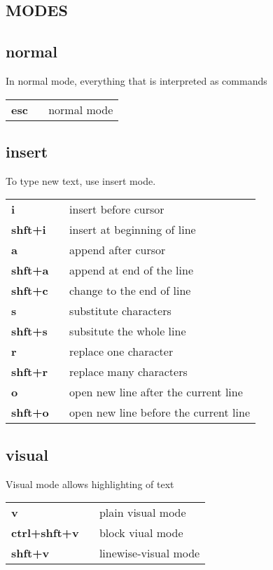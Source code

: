 \documentclass[10pt,landscape]{article}
\begin{document}
\begin{multicols*}{3}

\section{MODES}
\subsection{normal}
In normal mode, everything that is interpreted as commands \\
\vspace{5pt}
\begin{tabular}{@{\hspace{2mm}}ll@{}}
{\bfseries esc} &~ normal mode \\
\end{tabular}

\subsection{insert}
To type new text, use insert mode. \\
\vspace{5pt}
\begin{tabular}{@{\hspace{2mm}}ll@{}}
{\bfseries i} &~ insert before cursor \\
{\bfseries shft+i} &~ insert at beginning of line \\
{\bfseries a} &~ append after cursor \\
{\bfseries shft+a} &~ append at end of the line \\
{\bfseries shft+c} &~ change to the end of line \\
{\bfseries s} &~ substitute characters \\
{\bfseries shft+s} &~ subsitute the whole line \\
{\bfseries r} &~ replace one character \\
{\bfseries shft+r} &~ replace many characters \\
{\bfseries o} &~ open new line after the current line \\
{\bfseries shft+o} &~ open new line before the current line \\
\end{tabular}

\subsection{visual}
Visual mode allows highlighting of text \\
\vspace{5pt}
\begin{tabular}{@{\hspace{2mm}}ll@{}}
{\bfseries v} &~ plain visual mode \\
{\bfseries ctrl+shft+v} &~ block viual mode \\
{\bfseries shft+v} &~ linewise-visual mode \\
\end{tabular}


\end{multicols*}
\end{document}
